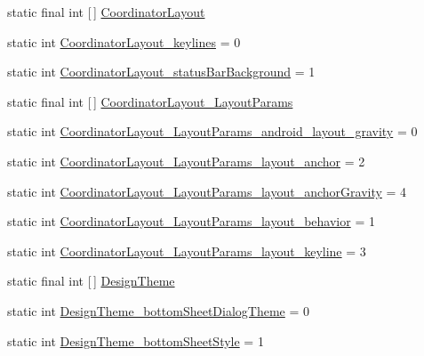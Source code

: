 \begin{DoxyCompactItemize}
\item 
static final int \mbox{[}$\,$\mbox{]} \hyperlink{classandroid_1_1support_1_1v7_1_1cardview_1_1R_1_1styleable_af6588adcd8d900f07f32f7bc3055e04d}{Coordinator\+Layout}
\item 
static int \hyperlink{classandroid_1_1support_1_1v7_1_1cardview_1_1R_1_1styleable_a8eec866472a48cbeb40fe82ed1bceb74}{Coordinator\+Layout\+\_\+keylines} = 0
\item 
static int \hyperlink{classandroid_1_1support_1_1v7_1_1cardview_1_1R_1_1styleable_a3e4084475fab0e54b108b676c93f7eb7}{Coordinator\+Layout\+\_\+status\+Bar\+Background} = 1
\item 
static final int \mbox{[}$\,$\mbox{]} \hyperlink{classandroid_1_1support_1_1v7_1_1cardview_1_1R_1_1styleable_afac1c5752b8eb35d30db48df7a9eea89}{Coordinator\+Layout\+\_\+\+Layout\+Params}
\item 
static int \hyperlink{classandroid_1_1support_1_1v7_1_1cardview_1_1R_1_1styleable_a7b843781d69c0606812c7b42334fffc0}{Coordinator\+Layout\+\_\+\+Layout\+Params\+\_\+android\+\_\+layout\+\_\+gravity} = 0
\item 
static int \hyperlink{classandroid_1_1support_1_1v7_1_1cardview_1_1R_1_1styleable_a9b8fc3c3e83fa23e3b7600c6fac01f94}{Coordinator\+Layout\+\_\+\+Layout\+Params\+\_\+layout\+\_\+anchor} = 2
\item 
static int \hyperlink{classandroid_1_1support_1_1v7_1_1cardview_1_1R_1_1styleable_a45b105447f04b1d7316dfedc36cf454f}{Coordinator\+Layout\+\_\+\+Layout\+Params\+\_\+layout\+\_\+anchor\+Gravity} = 4
\item 
static int \hyperlink{classandroid_1_1support_1_1v7_1_1cardview_1_1R_1_1styleable_a7b12af163a68314e93350a2fddb194d5}{Coordinator\+Layout\+\_\+\+Layout\+Params\+\_\+layout\+\_\+behavior} = 1
\item 
static int \hyperlink{classandroid_1_1support_1_1v7_1_1cardview_1_1R_1_1styleable_a8438ddb43a953883a300596ca7b1f39e}{Coordinator\+Layout\+\_\+\+Layout\+Params\+\_\+layout\+\_\+keyline} = 3
\item 
static final int \mbox{[}$\,$\mbox{]} \hyperlink{classandroid_1_1support_1_1v7_1_1cardview_1_1R_1_1styleable_af2ab89f285aaee8ac3e0729dec94e16d}{Design\+Theme}
\item 
static int \hyperlink{classandroid_1_1support_1_1v7_1_1cardview_1_1R_1_1styleable_a757520d29ac651f85eab4b6503097f00}{Design\+Theme\+\_\+bottom\+Sheet\+Dialog\+Theme} = 0
\item 
static int \hyperlink{classandroid_1_1support_1_1v7_1_1cardview_1_1R_1_1styleable_a836f93ed42ba933abdd786be29d4126e}{Design\+Theme\+\_\+bottom\+Sheet\+Style} = 1

\end{DoxyCompactItemize}
